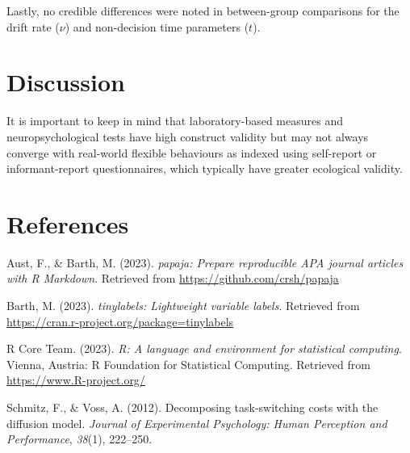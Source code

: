 \documentclass[
  man]{apa6}
\newlength{\cslhangindent}
\newenvironment{CSLReferences}[2] %
 {\begin{list}{}{%
  \setlength{\itemindent}{0pt}
  \setlength{\leftmargin}{0pt}
  \setlength{\parsep}{0pt}
  \ifodd #1
   \setlength{\leftmargin}{\cslhangindent}
   \setlength{\itemindent}{-1\cslhangindent}
  \fi
  \setlength{\itemsep}{#2\baselineskip}}}
 {\end{list}}
\begin{document}
Lastly, no credible differences were noted in between-group comparisons for the drift rate (\(\nu\)) and non-decision time parameters (\(t\)).

\section{Discussion}\label{discussion}

It is important to keep in mind that laboratory-based measures and neuropsychological tests have high construct validity but may not always converge with real-world flexible behaviours as indexed using self-report or informant-report questionnaires, which typically have greater ecological validity.

\newpage

\section{References}\label{references}

\label{refs}
\begin{CSLReferences}{1}{0}
Aust, F., \& Barth, M. (2023). \emph{{papaja}: {Prepare} reproducible {APA} journal articles with {R Markdown}}. Retrieved from \url{https://github.com/crsh/papaja}

Barth, M. (2023). \emph{{tinylabels}: Lightweight variable labels}. Retrieved from \url{https://cran.r-project.org/package=tinylabels}

R Core Team. (2023). \emph{R: A language and environment for statistical computing}. Vienna, Austria: R Foundation for Statistical Computing. Retrieved from \url{https://www.R-project.org/}

Schmitz, F., \& Voss, A. (2012). Decomposing task-switching costs with the diffusion model. \emph{Journal of Experimental Psychology: Human Perception and Performance}, \emph{38}(1), 222--250.

\end{CSLReferences}
\end{document}
